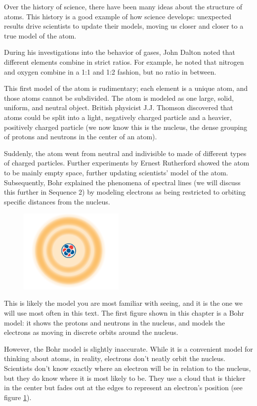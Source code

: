 Over the history of science, there have been many ideas about the structure of
atoms. This history is a good example of how science develops: unexpected
results drive scientists to update their models, moving us closer and closer to
a true model of the atom.

During his investigations into the behavior of gases, John Dalton noted that 
different elements combine in strict ratios. For example, he noted that nitrogen 
and oxygen combine in a 1:1 and 1:2 fashion, but no ratio in between.

This first model of the atom is rudimentary; each element is a unique atom,
and those atoms cannot be subdivided. The atom is modeled as one large, solid,
uniform, and neutral object. British physicist J.J. Thomson discovered that
atoms could be split into a light, negatively charged particle and a heavier,
positively charged particle (we now know this is the nucleus, the dense
grouping of protons and neutrons in the center of an atom).

Suddenly, the atom went from neutral and indivisible to made of different types
of charged particles. Further experiments by Ernest Rutherford showed the atom
to be mainly empty space, further updating scientists' model of the atom.
Subsequently, Bohr explained the phenomena of spectral lines (we will discuss
this further in Sequence 2) by modeling electrons as being restricted to
orbiting specific distances from the nucleus.

\begin{figure}
\noindent\includegraphics[width=2in]{atomCloud.png}
\caption{}
\label{fig:atomCloud}
\end{figure}

This is likely the model you are most familiar with seeing, and it is the one we
will use most often in this text. The first figure shown in this chapter is a Bohr
model: it shows the protons and neutrons in the nucleus, and models the electrons 
as moving in discrete orbits around the nucleus. 

However, the Bohr model is slightly inaccurate. While it is a convenient model for
thinking about atoms, in reality, electrons don't neatly orbit the nucleus.
Scientists don't know exactly where an electron will be in relation to the
nucleus, but they do know where it is most likely to be. They use a cloud that is
thicker in the center but fades out at the edges to represent an electron's
position (see figure \ref{fig:atomCloud}).

